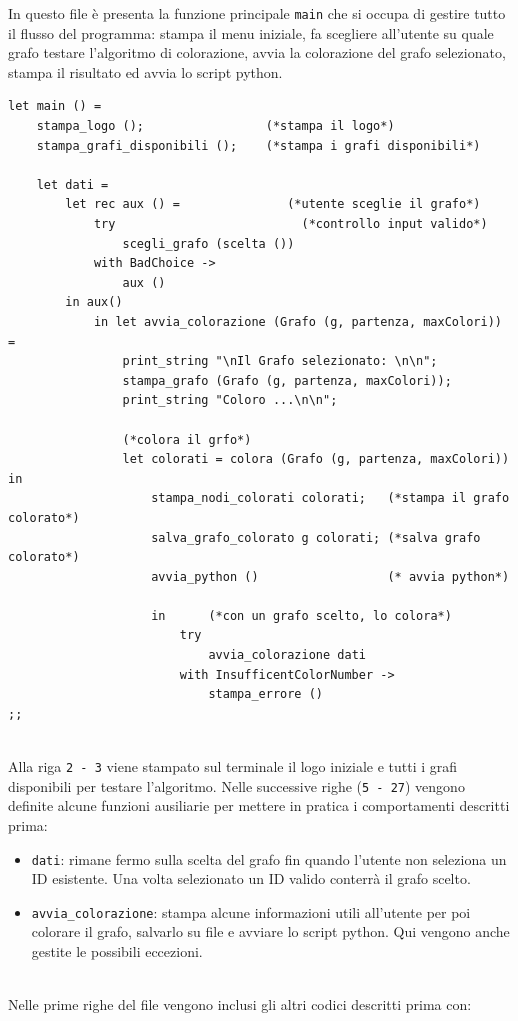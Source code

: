 In questo file è presenta la funzione principale \lstinline[style=cmd]|main| che si occupa di gestire tutto il flusso del programma: stampa il menu iniziale, fa scegliere all'utente su quale grafo testare l'algoritmo di colorazione, avvia la colorazione del grafo selezionato, stampa il risultato ed avvia lo script python.
\newpage
\begin{lstlisting}[style=caml, caption={Parte del codice contenuto in main.ml }]
let main () = 
	stampa_logo ();                 (*stampa il logo*)
	stampa_grafi_disponibili ();    (*stampa i grafi disponibili*)

	let dati = 
		let rec aux () =               (*utente sceglie il grafo*)
			try                          (*controllo input valido*)
				scegli_grafo (scelta ())
			with BadChoice -> 
				aux () 
		in aux() 
			in let avvia_colorazione (Grafo (g, partenza, maxColori)) = 
				print_string "\nIl Grafo selezionato: \n\n"; 
				stampa_grafo (Grafo (g, partenza, maxColori)); 
				print_string "Coloro ...\n\n";
				 
				(*colora il grfo*)
				let colorati = colora (Grafo (g, partenza, maxColori)) in     
					stampa_nodi_colorati colorati;   (*stampa il grafo colorato*)
					salva_grafo_colorato g colorati; (*salva grafo colorato*)
					avvia_python ()                  (* avvia python*)

					in      (*con un grafo scelto, lo colora*)
						try                                
							avvia_colorazione dati  
						with InsufficentColorNumber -> 
							stampa_errore ()
;;

\end{lstlisting}
\ \\
Alla riga \lstinline[style=cmd]|2 - 3| viene stampato sul terminale il logo iniziale e tutti i grafi disponibili per testare l'algoritmo. Nelle successive righe (\lstinline[style=cmd]|5 - 27|) vengono definite alcune funzioni ausiliarie per mettere in pratica i comportamenti descritti prima:

\begin{itemize}
	\item \lstinline[style=cmd]|dati|: rimane fermo sulla scelta del grafo fin quando l'utente non seleziona un ID esistente. Una volta selezionato un ID valido conterrà il grafo scelto. %
	\item \lstinline[style=cmd]|avvia_colorazione|: stampa alcune informazioni utili all'utente per poi colorare il grafo, salvarlo su file e avviare lo script python. Qui vengono anche gestite le possibili eccezioni.
\end{itemize}
\ \\
Nelle prime righe del file vengono inclusi gli altri codici descritti prima con:

